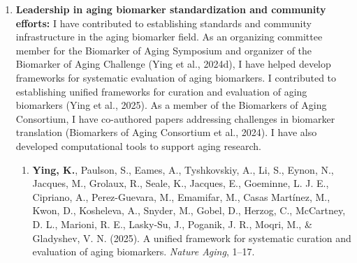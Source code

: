 \documentclass{nihbiosketch}
\begin{document}
\begin{enumerate}
\begin{enumerate}
\item Li, T., Ning, Z., Yang, Z., Zhai, R., Zheng, C., Xu, W., Wang, Y., \textbf{Ying, K.}, Chen, Y., \& Shen, X. (2021). Total genetic contribution assessment across the human genome. \textit{Nature Communications}, 12(1), 2845. PMID: 33990588; PMCID: PMC8121943

\item Zhang, B., Tarkhov, A. E., Ratzan, W., \textbf{Ying, K.}, Moqri, M., Poganik, J. R., Barre, B., Trapp, A., Zoller, J. A., Haghani, A., Horvath, S., Peshkin, L., \& Gladyshev, V. N. (2022). \textit{Epigenetic profiling and incidence of disrupted development point to gastrulation as aging ground zero in Xenopus laevis}. bioRxiv.

\item Rothi, M. H., Sarkar, G. C., Al Haddad, J., Mitchell, W., \textbf{Ying, K.}, Pohl, N., Sotomayor-Mena, R. G., Natale, J., Dellacona, S., Gladyshev, V. N., \& Greer, E. L. (2024). The 18S rRNA Methyltransferase DIMT-1 Regulates Lifespan in the Germline Later in Life. \textit{bioRxiv}. PMID: 38798397; PMCID: PMC11118296

\end{enumerate}

\item \textbf{Leadership in aging biomarker standardization and community efforts:} 
I have contributed to establishing standards and community infrastructure in the aging biomarker field. As an organizing committee member for the Biomarker of Aging Symposium and organizer of the Biomarker of Aging Challenge (Ying et al., 2024d), I have helped develop frameworks for systematic evaluation of aging biomarkers. I contributed to establishing unified frameworks for curation and evaluation of aging biomarkers (Ying et al., 2025). As a member of the Biomarkers of Aging Consortium, I have co-authored papers addressing challenges in biomarker translation (Biomarkers of Aging Consortium et al., 2024). I have also developed computational tools to support aging research. 

\begin{enumerate}

\item \textbf{Ying, K.}, Paulson, S., Eames, A., Tyshkovskiy, A., Li, S., Eynon, N., Jacques, M., Grolaux, R., Seale, K., Jacques, E., Goeminne, L. J. E., Cipriano, A., Perez-Guevara, M., Emamifar, M., Casas Martínez, M., Kwon, D., Kosheleva, A., Snyder, M., Gobel, D., Herzog, C., McCartney, D. L., Marioni, R. E., Lasky-Su, J., Poganik, J. R., Moqri, M., \& Gladyshev, V. N. (2025). A unified framework for systematic curation and evaluation of aging biomarkers. \textit{Nature Aging}, 1--17.


\end{enumerate}
\end{enumerate}
\end{document}
